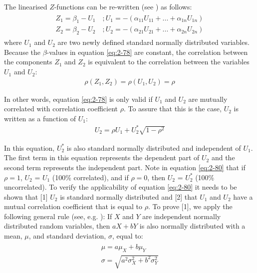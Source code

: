 The linearised $Z$-functions can be re-written (see ) as follows:
\begin{align}
\begin{array}{l} {Z_{1} =\beta _{1} -U_{1} \quad ; U_{1} =-\left(\alpha _{11} U_{11} +...+\alpha _{1n} U_{1n} \right)} \\ {Z_{2} =\beta _{2} -U_{2} \quad ; U_{2} =-\left(\alpha _{21} U_{21} +...+\alpha _{2n} U_{2n} \right)} \end{array}\label{eq:2-78} 
\end{align}
where $U_1$ and $U_2$ are two newly defined standard normally distributed variables. Because the $\beta $-values in equation \eqref{eq:2-78} are constant, the correlation between the components $Z_1$ and $Z_2$ is equivalent to the correlation between the variables $U_1$ and $U_2$:
\begin{align}
\rho \left(Z_{1} ,Z_{2} \right)=\rho \left(U_{1} ,U_{2} \right)=\rho \label{eq:2-79} 
\end{align}

In other words, equation \eqref{eq:2-78} is only valid if $U_1$ and $U_2$ are mutually correlated with correlation coefficient $\rho $. To assure that this is the case, $U_2$ is written as a function of $U_1$: 
\begin{align}
U_{2} =\rho  U_{1} +U_{2}^{*} \sqrt{1-\rho ^{2} } \label{eq:2-80} 
\end{align}

In this equation, $U_2^{*}$ is also standard normally distributed and independent of $U_1$. The first term in this equation represents the dependent part of $U_2$ and the second term represents the independent part. Note in equation \eqref{eq:2-80} that if $\rho  = 1$, $U_2$ = $U_1$ (100\% correlated), and if $\rho = 0$, then $U_2$ = $U_2^{*}$ (100\% uncorrelated). To verify the applicability of equation \eqref{eq:2-80} it needs to be shown that [1] $U_2$ is standard normally distributed and [2] that $U_1$ and $U_2$ have a mutual correlation coefficient that is equal to $\rho $. To prove [1], we apply the following general rule (see, e.g. \cite{GrimmettStirzaker1983}): If $X$ and $Y$ are independent normally distributed random variables, then $aX+bY$ is also normally distributed with a mean, $\mu$, and standard deviation, $\sigma$, equal to:
\begin{align}
\begin{array}{l} {\mu =a\mu _{X} +b\mu _{Y} } \\ {\sigma =\sqrt{a^{2} \sigma _{X}^{2} +b^{2} \sigma _{Y}^{2} } } \end{array}\label{0.78)} 
\end{align}

